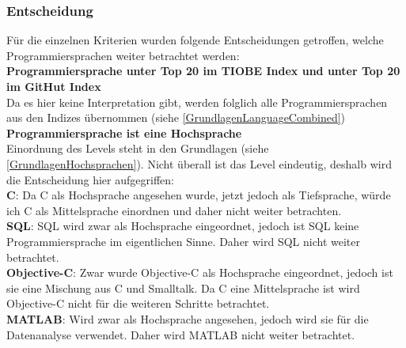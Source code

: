 \documentclass[ngerman]{article}
\begin{document}
    \subsubsection{Entscheidung}
    \label{BinaryLanguageEntscheidung}
    Für die einzelnen Kriterien wurden folgende Entscheidungen getroffen, welche Programmiersprachen weiter betrachtet werden:\\
    \textbf{Programmiersprache unter Top 20 im TIOBE Index und unter Top 20 im GitHut Index}\\
    Da es hier keine Interpretation gibt, werden folglich alle Programmiersprachen aus den Indizes übernommen (siehe \ref{GrundlagenLanguageCombined})\\
    \textbf{Programmiersprache ist eine Hochsprache}\\
    Einordnung des Levels steht in den Grundlagen (siehe \ref{GrundlagenHochsprachen}). Nicht überall ist das Level eindeutig, deshalb wird die Entscheidung hier aufgegriffen:\\
    \textbf{C}: Da C als Hochsprache angesehen wurde, jetzt jedoch als Tiefsprache, würde ich C als Mittelsprache einordnen und daher nicht weiter betrachten.\\
    \textbf{SQL}: SQL wird zwar als Hochsprache eingeordnet, jedoch ist SQL keine Programmiersprache im eigentlichen Sinne. Daher wird SQL nicht weiter betrachtet.\\
    \textbf{Objective-C}: Zwar wurde Objective-C als Hochsprache eingeordnet, jedoch ist sie eine Mischung aus C und Smalltalk. Da C eine Mittelsprache ist wird Objective-C nicht für die weiteren Schritte betrachtet.\\
    \textbf{MATLAB}: Wird zwar als Hochsprache angesehen, jedoch wird sie für die Datenanalyse verwendet. Daher wird MATLAB nicht weiter betrachtet.\\
\end{document}
